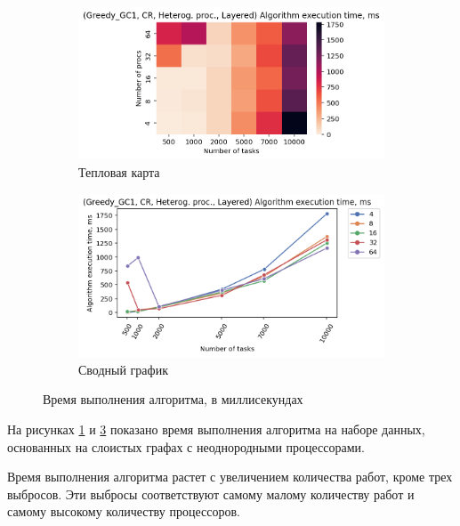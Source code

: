 \begin{figure}[!htbp]
    \centering
    \begin{subfigure}{0.49\textwidth}
        \includegraphics[width=\textwidth]{imgs/unbalanced/CR/et_heatmap.png}
        \caption{Тепловая карта}
        \label{fig:CR-disbalanced-exec-time-heatmap}
    \end{subfigure}
    \hfill
    \begin{subfigure}{0.49\textwidth}
        \includegraphics[width=\textwidth]{imgs/unbalanced/CR/tr_graph.png}
        \caption{Сводный график}
        \label{fig:CR-disbalanced-exec-time-compiled}
    \end{subfigure}
    \caption{Время выполнения алгоритма, в миллисекундах}
\end{figure}

На рисунках \ref{fig:CR-disbalanced-exec-time-heatmap} и \ref{fig:CR-disbalanced-exec-time-compiled} показано время выполнения алгоритма на наборе данных, основанных на слоистых графах с неоднородными процессорами.

Время выполнения алгоритма растет с увеличением количества работ, кроме трех выбросов. Эти выбросы соответствуют самому малому количеству работ и самому высокому количеству процессоров.

